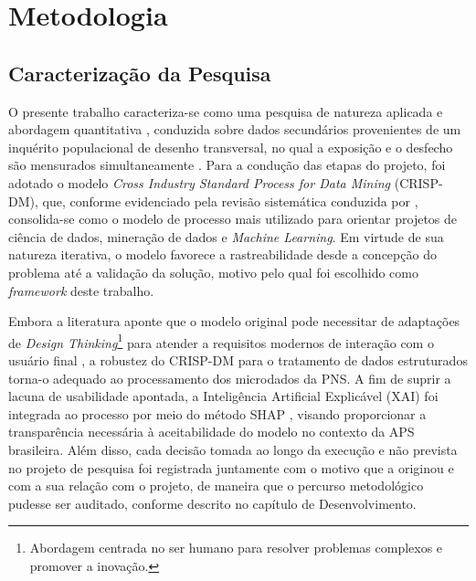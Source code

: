 \chapter{Metodologia}\label{cap:metodologia}

\section{Caracterização da Pesquisa}\label{sec:caracterizacao}

O presente trabalho caracteriza-se como uma pesquisa de natureza aplicada e abordagem quantitativa \cite{prodanov2013metodologia}, conduzida sobre dados secundários provenientes de um inquérito populacional de desenho transversal, no qual a exposição e o desfecho são mensurados simultaneamente \cite{rothman2008modern}. Para a condução das etapas do projeto, foi adotado o modelo \textit{Cross Industry Standard Process for Data Mining} (CRISP-DM), que, conforme evidenciado pela revisão sistemática conduzida por \textcite{schroer2021systematic}, consolida-se como o modelo de processo mais utilizado para orientar projetos de ciência de dados, mineração de dados e \textit{Machine Learning}. Em virtude de sua natureza iterativa, o modelo favorece a rastreabilidade desde a concepção do problema até a validação da solução, motivo pelo qual foi escolhido como \textit{framework} deste trabalho.

Embora a literatura aponte que o modelo original pode necessitar de adaptações de \textit{Design Thinking}\footnote{Abordagem centrada no ser humano para resolver problemas complexos e promover a inovação.} para atender a requisitos modernos de interação com o usuário final \cite{schroer2021systematic}, a robustez do CRISP-DM para o tratamento de dados estruturados torna-o adequado ao processamento dos microdados da PNS. A fim de suprir a lacuna de usabilidade apontada, a Inteligência Artificial Explicável (XAI) foi integrada ao processo por meio do método SHAP \cite{salih2025perspective}, visando proporcionar a transparência necessária à aceitabilidade do modelo no contexto da APS brasileira. Além disso, cada decisão tomada ao longo da execução e não prevista no projeto de pesquisa foi registrada juntamente com o motivo que a originou e com a sua relação com o projeto, de maneira que o percurso metodológico pudesse ser auditado, conforme descrito no capítulo de Desenvolvimento.

